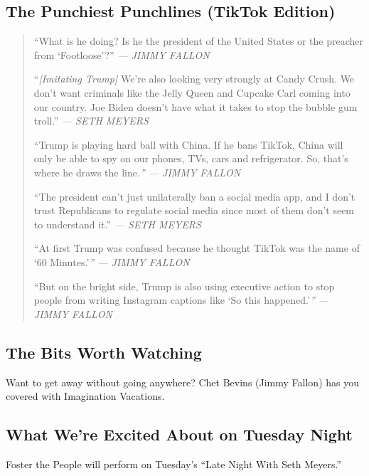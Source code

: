 \hypertarget{the-punchiest-punchlines-tiktok-edition}{%
\subsection{The Punchiest Punchlines (TikTok
Edition)}\label{the-punchiest-punchlines-tiktok-edition}}

\begin{quote}
``What is he doing? Is he the president of the United States or the
preacher from `Footloose'?'' \emph{--- JIMMY FALLON}

``\emph{{[}Imitating Trump{]}} We're also looking very strongly at Candy
Crush. We don't want criminals like the Jelly Queen and Cupcake Carl
coming into our country. Joe Biden doesn't have what it takes to stop
the bubble gum troll.'' \emph{--- SETH MEYERS}

``Trump is playing hard ball with China. If he bans TikTok, China will
only be able to spy on our phones, TVs, cars and refrigerator. So,
that's where he draws the line.\emph{'' --- JIMMY FALLON}

``The president can't just unilaterally ban a social media app, and I
don't trust Republicans to regulate social media since most of them
don't seem to understand it.'' \emph{--- SETH MEYERS}

``At first Trump was confused because he thought TikTok was the name of
`60 Minutes.'\emph{'' --- JIMMY FALLON}

``But on the bright side, Trump is also using executive action to stop
people from writing Instagram captions like `So this happened.'\emph{''
--- JIMMY FALLON}
\end{quote}

\hypertarget{the-bits-worth-watching}{%
\subsection{The Bits Worth Watching}\label{the-bits-worth-watching}}

Want to get away without going anywhere? Chet Bevins (Jimmy Fallon) has
you covered with Imagination Vacations.

\hypertarget{what-were-excited-about-on-tuesday-night}{%
\subsection{What We're Excited About on Tuesday
Night}\label{what-were-excited-about-on-tuesday-night}}

Foster the People will perform on Tuesday's ``Late Night With Seth
Meyers.''

